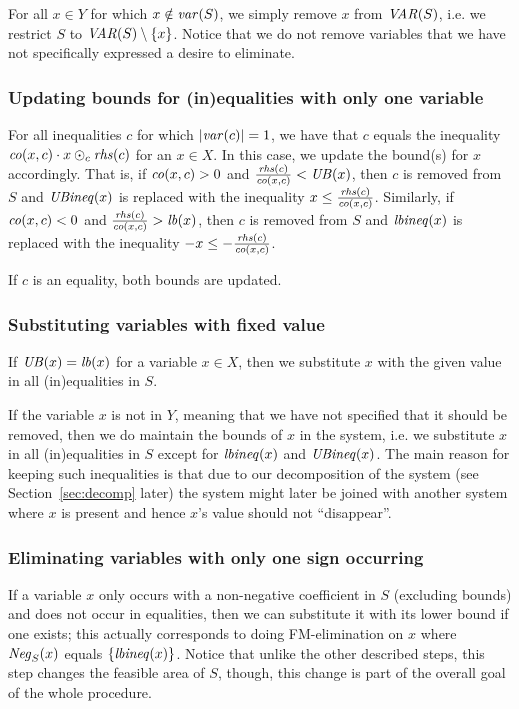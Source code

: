 For all $x\in Y$ for which $x \notin \mathit{var}(S)$, we simply remove $x$ from $\mathit{VAR}(S)$, i.e. we restrict $S$ to $\mathit{VAR}(S)\setminus\{x\}$. Notice that we do not remove variables that we have not specifically expressed a desire to eliminate.
%	
\subsubsection{Updating bounds for (in)equalities with only one variable}\label{para:singleton} For all inequalities $c$ for which $|\mathit{var}(c)|=1$, we have that $c$ equals the inequality  $\mathit{co}(x,c)\cdot x \odot_c \mathit{rhs}(c)$ for an $x\in X$. In this case, we update the bound(s) for $x$ accordingly. That is, if $\mathit{co}(x,c)>0$ and $\frac{\mathit{rhs}(c)}{\mathit{co}(x,c)}<\mathit{UB}(x)$, then $c$ is removed from $S$ and $\mathit{UBineq}(x)$ is replaced with the inequality $x \leq \frac{\mathit{rhs}(c)}{\mathit{co}(x,c)}$.  
Similarly, if $\mathit{co}(x,c)<0$ and $\frac{\mathit{rhs}(c)}{\mathit{co}(x,c)}> \mathit{lb}(x)$, then $c$ is removed from $S$ and $\mathit{lbineq}(x)$ is replaced with the inequality $-x \leq - \frac{\mathit{rhs}(c)}{\mathit{co}(x,c)}$. 

If $c$ is an equality, both bounds are updated. 
%
\subsubsection{Substituting variables with fixed value}\label{para:fixed} If $\mathit{UB}(x) = \mathit{lb}(x)$ for a variable $x\in X$, then we substitute $x$ with the given value in all (in)equalities in $S$. 

If the variable $x$ is not in $Y$, meaning that we have not specified that it should be removed, then we do maintain the bounds of $x$ in the system, i.e. we substitute $x$ in all (in)equalities in $S$ except for $\mathit{lbineq}(x)$ and $\mathit{UBineq}(x)$. The main reason for keeping such inequalities is that due to our decomposition of the system (see Section~\ref{sec:decomp} later) the system might later be joined with another system where $x$ is present and hence $x$'s value should not ``disappear''. 
%
\subsubsection{Eliminating variables with only one sign occurring}\label{para:oneSign} If a variable $x$ only occurs with a non-negative coefficient in $S$ (excluding bounds) and does not occur in equalities, then we can substitute it with its lower bound if one exists; this actually corresponds to doing FM-elimination on $x$ where $\mathit{Neg}_S(x)$ equals $\{\mathit{lbineq}(x)\}$. Notice that unlike the other described steps, this step changes the feasible area of $S$, though, this change is part of the overall goal of the whole procedure. 

